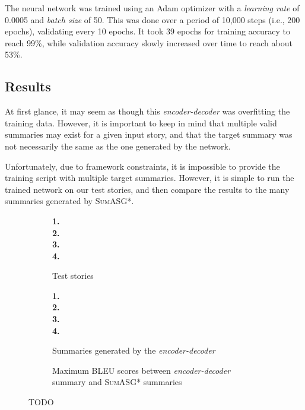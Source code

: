 The neural network was trained using an Adam optimizer with a \textit{learning rate} of 0.0005 and \textit{batch size} of 50. This was done over a period of 10,000 steps (i.e., 200 epochs), validating every 10 epochs. It took 39 epochs for training accuracy to reach 99\%, while validation accuracy slowly increased over time to reach about 53\%.

\subsection{Results}

At first glance, it may seem as though this \textit{encoder-decoder} was overfitting the training data. However, it is important to keep in mind that multiple valid summaries may exist for a given input story, and that the target summary was not necessarily the same as the one generated by the network.

Unfortunately, due to framework constraints, it is impossible to provide the training script with multiple target summaries. However, it is simple to run the trained network on our test stories, and then compare the results to the many summaries generated by \textsc{SumASG*}.

\begin{figure}[H]
\begin{subfigure}{\textwidth}
\begin{displayquote}
\textbf{1.}\\
\textbf{2.}\\
\textbf{3.}\\
\textbf{4.}\\
\end{displayquote}
\caption{Test stories}
\end{subfigure}
\begin{subfigure}{\textwidth}
\vspace{\baselineskip}
\begin{displayquote}
\textbf{1.}\\
\textbf{2.}\\
\textbf{3.}\\
\textbf{4.}\\
\end{displayquote}
\caption{Summaries generated by the \textit{encoder-decoder}}
\end{subfigure}
\begin{subfigure}{\textwidth}
\vspace{\baselineskip}

\caption{Maximum BLEU scores between \textit{encoder-decoder} summary and \textsc{SumASG*} summaries}
\end{subfigure}
\caption{TODO}
\label{fig:neural_network_testing}
\end{figure}

